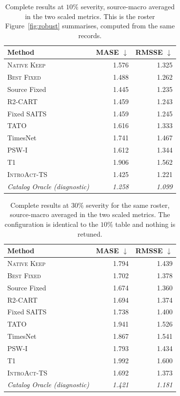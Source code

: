 \documentclass{article}
\newcommand{\oracle}[1]{\textit{\textcolor{phgray}{#1}}}
\newcommand{\introact}{\textsc{IntroAct-TS}}
\begin{document}
\begin{table}[!t]
  \caption{Complete results at $10\%$ severity, source-macro averaged in the two scaled metrics. This is the roster Figure~\ref{fig:robust} summarises, computed from the same records.}
  \label{tab:app-sev10}
  \centering
  \small
  \setlength{\tabcolsep}{4pt}
\begin{tabular*}{\textwidth}{@{\extracolsep{\fill}}lrr@{}}
    \toprule
    Method & MASE $\downarrow$ & RMSSE $\downarrow$ \\
    \midrule
    \textsc{Native Keep} & 1.576 & 1.325 \\
    \textsc{Best Fixed} & 1.488 & 1.262 \\
    Source Fixed & 1.445 & 1.235 \\
    R2-CART & 1.459 & 1.243 \\
    Fixed SAITS & 1.459 & 1.245 \\
    TATO & 1.616 & 1.333 \\
    TimesNet & 1.741 & 1.467 \\
    PSW-I & 1.612 & 1.344 \\
    T1 & 1.906 & 1.562 \\
    \midrule
    \rowcolor{bestgray}\introact{} & 1.425 & 1.221 \\
    \midrule
    \oracle{Catalog Oracle (diagnostic)} & \oracle{1.258} & \oracle{1.099} \\
    \bottomrule
  \end{tabular*}
\end{table}

\begin{table}[!t]
  \caption{Complete results at $30\%$ severity for the same roster, source-macro averaged in the two scaled metrics. The configuration is identical to the $10\%$ table and nothing is retuned.}
  \label{tab:app-sev30}
  \centering
  \small
  \setlength{\tabcolsep}{4pt}
\begin{tabular*}{\textwidth}{@{\extracolsep{\fill}}lrr@{}}
    \toprule
    Method & MASE $\downarrow$ & RMSSE $\downarrow$ \\
    \midrule
    \textsc{Native Keep} & 1.794 & 1.439 \\
    \textsc{Best Fixed} & 1.702 & 1.378 \\
    Source Fixed & 1.674 & 1.360 \\
    R2-CART & 1.694 & 1.374 \\
    Fixed SAITS & 1.738 & 1.400 \\
    TATO & 1.941 & 1.526 \\
    TimesNet & 1.867 & 1.541 \\
    PSW-I & 1.793 & 1.434 \\
    T1 & 1.992 & 1.600 \\
    \midrule
    \rowcolor{bestgray}\introact{} & 1.692 & 1.373 \\
    \midrule
    \oracle{Catalog Oracle (diagnostic)} & \oracle{1.421} & \oracle{1.181} \\
    \bottomrule
  \end{tabular*}
\end{table}
\end{document}
